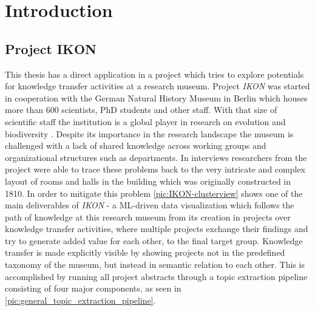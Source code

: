 %
\chapter{Introduction}
\label{chap:introduction}

\section{Project IKON}

This thesis has a direct application in a project which tries to explore potentials for knowledge transfer activities at a research museum. Project \textit{IKON} was started in cooperation with the German Natural History Museum in Berlin which houses more than 600  scientists, PhD students and other staff. With that size of scientific staff the institution is a global player in research on evolution and biodiversity \cite{IntroducingMuseumFur}. Despite its importance in the research landscape the museum is challenged with a lack of shared knowledge across working groups and organizational structures such as departments. In interviews researchers from the project were able to trace these problems back to the very intricate and complex layout of rooms and halls in the building which was originally constructed in 1810. In order to mitigate this problem \autoref{pic:IKON-clusterview} shows one of the main deliverables of \textit{IKON} - a ML-driven data visualization which follows the path of knowledge at this research museum from its creation in projects over knowledge transfer activities, where multiple projects exchange their findings and try to generate added value for each other, to the final target group. Knowledge transfer is made explicitly visible by showing projects not in the predefined taxonomy of the museum, but instead in semantic relation to each other. This is accomplished by running all project abstracts through a topic extraction pipeline consisting of four major components, as seen in \autoref{pic:general_topic_extraction_pipeline}.  


